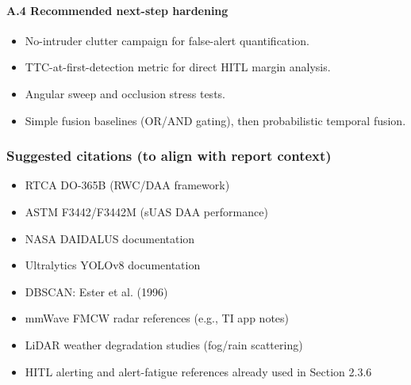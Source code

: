 \paragraph{A.4 Recommended next-step hardening}
\begin{itemize}
  \item No-intruder clutter campaign for false-alert quantification.
  \item TTC-at-first-detection metric for direct HITL margin analysis.
  \item Angular sweep and occlusion stress tests.
  \item Simple fusion baselines (OR/AND gating), then probabilistic temporal fusion.
\end{itemize}

\subsubsection*{Suggested citations (to align with report context)}
\begin{itemize}
  \item RTCA DO-365B (RWC/DAA framework)
  \item ASTM F3442/F3442M (sUAS DAA performance)
  \item NASA DAIDALUS documentation
  \item Ultralytics YOLOv8 documentation
  \item DBSCAN: Ester et al. (1996)
  \item mmWave FMCW radar references (e.g., TI app notes)
  \item LiDAR weather degradation studies (fog/rain scattering)
  \item HITL alerting and alert-fatigue references already used in Section 2.3.6
\end{itemize}
